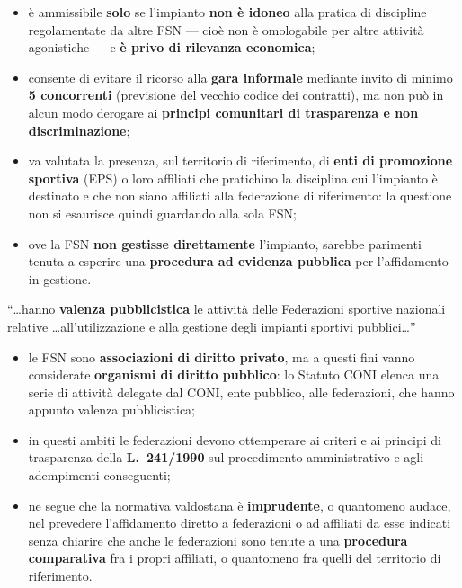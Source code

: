 \begin{itemize}
  \item è ammissibile \textbf{solo} se l'impianto \textbf{non è idoneo} alla pratica di discipline
    regolamentate da altre FSN --- cioè non è omologabile per altre attività agonistiche --- e
    \textbf{è privo di rilevanza economica};
  \item consente di evitare il ricorso alla \textbf{gara informale} mediante invito di minimo
    \textbf{5 concorrenti} (previsione del vecchio codice dei contratti), ma non può in alcun modo
    derogare ai \textbf{principi comunitari di trasparenza e non discriminazione};
  \item va valutata la presenza, sul territorio di riferimento, di \textbf{enti di promozione
    sportiva} (EPS) o loro affiliati che pratichino la disciplina cui l'impianto è destinato e che
    non siano affiliati alla federazione di riferimento: la questione non si esaurisce quindi
    guardando alla sola FSN;
  \item ove la FSN \textbf{non gestisse direttamente} l'impianto, sarebbe parimenti tenuta a
    esperire una \textbf{procedura ad evidenza pubblica} per l'affidamento in gestione.
\end{itemize}


``\dots hanno \textbf{valenza pubblicistica} le attività delle Federazioni sportive nazionali
relative \dots all'utilizzazione e alla gestione degli impianti sportivi pubblici\dots''

\begin{itemize}
  \item le FSN sono \textbf{associazioni di diritto privato}, ma a questi fini vanno considerate
    \textbf{organismi di diritto pubblico}: lo Statuto CONI elenca una serie di attività delegate
    dal CONI, ente pubblico, alle federazioni, che hanno appunto valenza pubblicistica;
  \item in questi ambiti le federazioni devono ottemperare ai criteri e ai principi di trasparenza
    della \textbf{L.\ 241/1990} sul procedimento amministrativo e agli adempimenti conseguenti;
  \item ne segue che la normativa valdostana è \textbf{imprudente}, o quantomeno audace, nel
    prevedere l'affidamento diretto a federazioni o ad affiliati da esse indicati senza chiarire
    che anche le federazioni sono tenute a una \textbf{procedura comparativa} fra i propri
    affiliati, o quantomeno fra quelli del territorio di riferimento.
\end{itemize}

